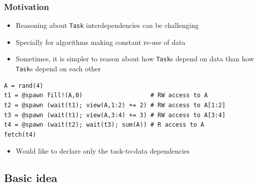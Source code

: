 \documentclass{beamer}
\begin{document}
\begin{frame}[fragile]
\frametitle{Motivation}

\begin{itemize}
    \item Reasoning about \texttt{Task} interdependencies can be
    challenging
    \item Specially for algorithms making constant re-use of data   
    \item Sometimes, it is simpler to reason about how \texttt{Task}s depend on data than how \texttt{Task}s depend on each other
\end{itemize}

\begin{example}
\begin{verbatim}    
A = rand(4)
t1 = @spawn fill!(A,0)                   # RW access to A
t2 = @spawn (wait(t1); view(A,1:2) += 2) # RW access to A[1:2]   
t3 = @spawn (wait(t1); view(A,3:4) += 3) # RW access to A[3:4]
t4 = @spawn (wait(t2); wait(t3); sum(A)) # R access to A
fetch(t4)
\end{verbatim}
\end{example}

\begin{itemize}
  \item<2-> \alert{Would like to declare only the task-to-data dependencies}
\end{itemize}

\end{frame}

\subsection{Basic idea}
\end{document}
